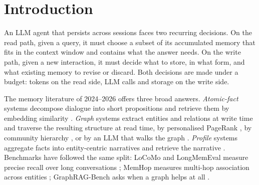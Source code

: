 \documentclass[11pt]{article}
\begin{document}
\begin{abstract}
61\% of the cells holding the old fact untouched, whereas propagation along the neighbourhood restores consistency above 95\%, at a selectivity cost that only a trained gate can pay. Locality is a cost where a global reader exists and the rule ignores the edge; it is an advantage where the rule reads the edge, and the only means of reach where no global reader exists. We close with an experimental agenda for the transition rule that these results motivate.
\end{abstract}

\section{Introduction}

An LLM agent that persists across sessions faces two recurring decisions. On the read path, given a query, it must choose a subset of its accumulated memory that fits in the context window and contains what the answer needs. On the write path, given a new interaction, it must decide what to store, in what form, and what existing memory to revise or discard. Both decisions are made under a budget: tokens on the read side, LLM calls and storage on the write side.

The memory literature of 2024--2026 offers three broad answers. \emph{Atomic-fact} systems decompose dialogue into short propositions and retrieve them by embedding similarity \cite{mem0,amem,memorybank}. \emph{Graph} systems extract entities and relations at write time and traverse the resulting structure at read time, by personalised PageRank \cite{hipporag}, by community hierarchy \cite{graphrag,lightrag}, or by an LLM that walks the graph \cite{tog}. \emph{Profile} systems aggregate facts into entity-centric narratives and retrieve the narrative \cite{prograph,ariadnemem,memora}. Benchmarks have followed the same split: LoCoMo and LongMemEval measure precise recall over long conversations \cite{locomo,longmemeval}; MemHop measures multi-hop association across entities \cite{prograph}; GraphRAG-Bench asks when a graph helps at all \cite{graphragbench}.
\end{document}
